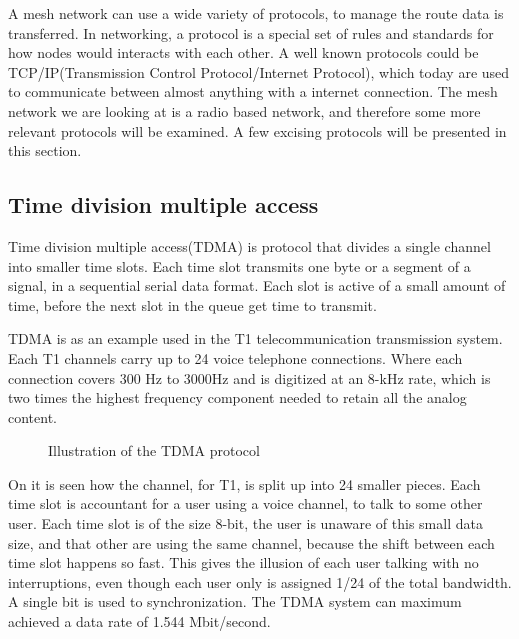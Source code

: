 A mesh network can use a wide variety of protocols, to manage the route data is transferred.
In networking, a protocol is a special set of rules and standards for how nodes would interacts with each other.
A well known protocols could be TCP/IP(Transmission Control Protocol/Internet Protocol), which today are used to communicate between almost anything with a internet connection.
The mesh network we are looking at is a radio based network, and therefore some more relevant protocols will be examined. 
A few excising protocols will be presented in this section.

\subsection{Time division multiple access}
Time division multiple access(TDMA) is protocol that divides a single channel into smaller time slots.
Each time slot transmits one byte or a segment of a signal, in a sequential serial data format.
Each slot is active of a small amount of time, before the next slot in the queue get time to transmit.

TDMA is as an example used in the T1 telecommunication transmission system.
Each T1 channels carry up to 24 voice telephone connections.
Where each connection covers 300 Hz to 3000Hz and is digitized at an 8-kHz rate, which is two times the highest frequency component needed to retain all the analog content.
\begin{figure}[!h]
	\centering
	\caption{Illustration of the TDMA protocol}
	\label{fig:TDMAfigure}
\end{figure}

On  it is seen how the channel, for T1, is split up into 24 smaller pieces.
Each time slot is accountant for a user using a voice channel, to talk to some other user.
Each time slot is of the size 8-bit, the user is unaware of this small data size, and that other are using the same channel, because the shift between each time slot happens so fast.
This gives the illusion of each user talking with no interruptions, even though each user only is assigned 1/24 of the total bandwidth.
A single bit is used to synchronization.
The TDMA system can maximum achieved a data rate of 1.544 Mbit/second.\cite{TDMA}

